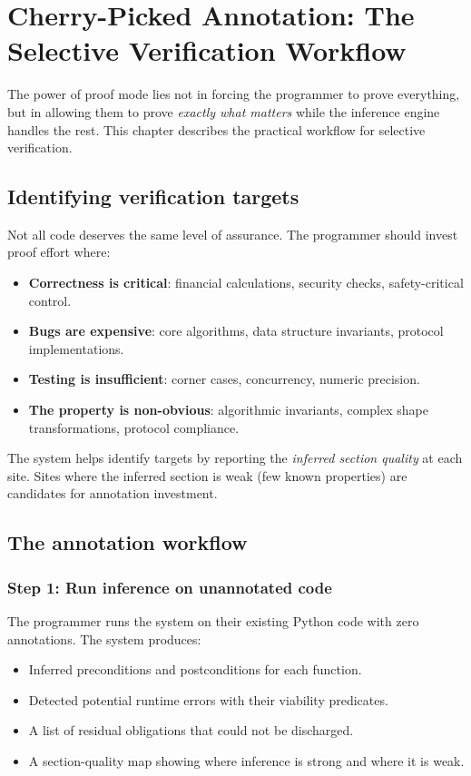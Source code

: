 \documentclass[11pt]{report}
\theoremstyle{definition}
\theoremstyle{plain}
\begin{document}
\chapter{Cherry-Picked Annotation: The Selective Verification Workflow}

The power of proof mode lies not in forcing the programmer to prove
everything, but in allowing them to prove \emph{exactly what matters} while
the inference engine handles the rest. This chapter describes the practical
workflow for selective verification.

\section{Identifying verification targets}

Not all code deserves the same level of assurance. The programmer should
invest proof effort where:
\begin{itemize}[nosep]
  \item \textbf{Correctness is critical}: financial calculations, security
        checks, safety-critical control.
  \item \textbf{Bugs are expensive}: core algorithms, data structure
        invariants, protocol implementations.
  \item \textbf{Testing is insufficient}: corner cases, concurrency, numeric
        precision.
  \item \textbf{The property is non-obvious}: algorithmic invariants, complex
        shape transformations, protocol compliance.
\end{itemize}

The system helps identify targets by reporting the \emph{inferred section
quality} at each site. Sites where the inferred section is weak (few known
properties) are candidates for annotation investment.

\section{The annotation workflow}

\subsection{Step 1: Run inference on unannotated code}

The programmer runs the system on their existing Python code with zero
annotations. The system produces:
\begin{itemize}[nosep]
  \item Inferred preconditions and postconditions for each function.
  \item Detected potential runtime errors with their viability predicates.
  \item A list of residual obligations that could not be discharged.
  \item A section-quality map showing where inference is strong and where it
        is weak.
\end{itemize}
\end{document}
